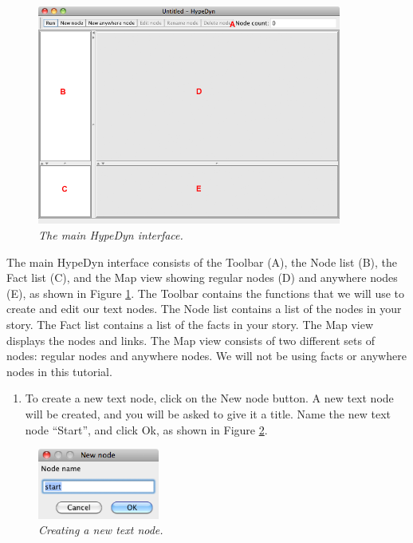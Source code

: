 \documentclass{article}
\begin{document}
\begin{figure}[ht]
  \centering
  \includegraphics[width=10cm]{images/hypedyn-tutorial-1-figure-2}
  \caption{\textit{The main HypeDyn interface.}}
  \label{fig:hypedyn}
\end{figure} 

The main HypeDyn interface consists of the Toolbar (A), the Node list (B), the
Fact list (C), and the Map view showing regular nodes (D) and anywhere nodes (E),
as shown in Figure \ref{fig:hypedyn}. The Toolbar contains the functions that we
will use to create and edit our text nodes. The Node list contains a list of the
nodes in your story. The Fact list contains a list of the facts in your story.
The Map view displays the nodes and links. The Map view consists of two different
sets of nodes: regular nodes and anywhere nodes. We will not be using facts or
anywhere nodes in this tutorial.

\begin{enumerate}
  \item To create a new text node, click on the New node button. A new text node
  will be created, and you will be asked to give it a title. Name the new text
  node ``Start'', and click Ok, as shown in Figure \ref{fig:new_node}.
\end{enumerate}

 
\begin{figure}[ht]
  \centering
  \includegraphics[width=4cm]{images/hypedyn-tutorial-1-figure-3}
  \caption{\textit{Creating a new text node.}}
  \label{fig:new_node}
\end{figure} 
\end{document}
